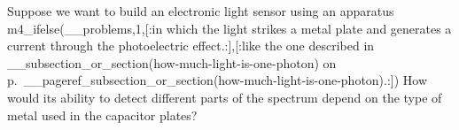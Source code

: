 Suppose we want to build an electronic light sensor using
an apparatus
m4_ifelse(__problems,1,[:in which the light strikes a metal plate and generates a current through the photoelectric effect.:],[:like the one described in __subsection_or_section(how-much-light-is-one-photon)
on p.~__pageref_subsection_or_section(how-much-light-is-one-photon).:]) How would its ability to detect
different parts of the spectrum depend on the type of metal
used in the capacitor plates?
